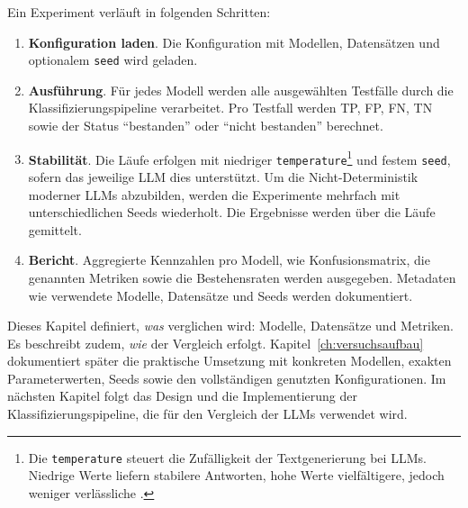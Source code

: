 Ein Experiment verläuft in folgenden Schritten:

\begin{enumerate}
    \item \textbf{Konfiguration laden}. Die Konfiguration mit Modellen, Datensätzen und optionalem \texttt{seed} wird geladen.
    \item \textbf{Ausführung}. Für jedes Modell werden alle ausgewählten Testfälle durch die Klassifizierungspipeline verarbeitet. Pro Testfall werden \ac{TP}, \ac{FP}, \ac{FN}, \ac{TN} sowie der Status \enquote{bestanden} oder \enquote{nicht bestanden} berechnet.
    \item \textbf{Stabilität}. Die Läufe erfolgen mit niedriger \texttt{temperature}\footnote{Die \texttt{temperature} steuert die Zufälligkeit der Textgenerierung bei \acp{LLM}. Niedrige Werte liefern stabilere Antworten, hohe Werte vielfältigere, jedoch weniger verlässliche \cite{ibm-llm-temperature}.} und festem \texttt{seed}, sofern das jeweilige \ac{LLM} dies unterstützt. Um die Nicht-Deterministik moderner \acp{LLM} abzubilden, werden die Experimente mehrfach mit unterschiedlichen Seeds wiederholt. Die Ergebnisse werden über die Läufe gemittelt.
    \item \textbf{Bericht}. Aggregierte Kennzahlen pro Modell, wie Konfusionsmatrix, die genannten Metriken sowie die Bestehensraten werden ausgegeben. Metadaten wie verwendete Modelle, Datensätze und Seeds werden dokumentiert.
\end{enumerate}

Dieses Kapitel definiert, \emph{was} verglichen wird: Modelle, Datensätze und Metriken. Es beschreibt zudem, \emph{wie} der Vergleich erfolgt. Kapitel~\ref{ch:versuchsaufbau} dokumentiert später die praktische Umsetzung mit konkreten Modellen, exakten Parameterwerten, Seeds sowie den vollständigen genutzten Konfigurationen. Im nächsten Kapitel folgt das Design und die Implementierung der Klassifizierungspipeline, die für den Vergleich der \acp{LLM} verwendet wird.
